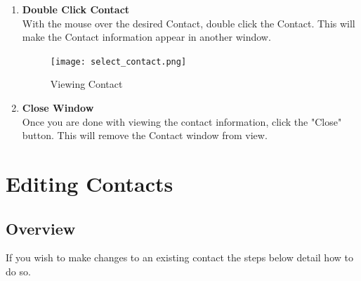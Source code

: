 \documentclass[a4paper, 11pt]{article}
\begin{document}
\begin{enumerate}[label=\textbf{\arabic*})]
    \item{\textbf{Double Click Contact}}\\ With the mouse over the desired Contact, double click the Contact. This will make the Contact information appear in another window.
    
    \begin{figure}[h!]
    \centering
      \texttt{[image: select\_contact.png]}
      \caption{Viewing Contact}
    \end{figure}
    
    \item{\textbf{Close Window}}\\ Once you are done with viewing the contact information, click the "Close" button. This will remove the Contact window from view.

\end{enumerate}

\clearpage

\section{Editing Contacts}
\subsection{Overview}
If you wish to make changes to an existing contact the steps below detail how to do so.
\end{document}
